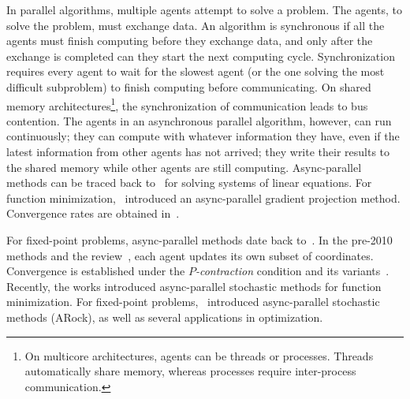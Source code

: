 In  parallel algorithms, multiple agents attempt to solve a problem. The agents, to solve the problem, must exchange data. An algorithm is synchronous if all the agents must finish computing before they exchange data, and only after the exchange is completed can they start the next computing cycle.  Synchronization requires every agent to wait for the slowest agent
(or the one solving the most difficult subproblem) to finish computing before communicating. On shared memory architectures\footnote{On multicore architectures, agents can be threads or processes. Threads automatically share memory, whereas processes require inter-process communication.}, the synchronization of communication leads to bus contention. The agents in an asynchronous parallel algorithm, however, can run continuously; they can compute with whatever information they have, even if the latest information from other agents
has not arrived; they write their results to the shared memory while other agents are still computing. Async-parallel methods can be traced back to~\citep{chazan1969chaotic} for solving systems of linear equations.
For function minimization,~\citep{bertsekas1989parallel} introduced an async-parallel gradient projection method. Convergence rates are obtained in~\citep{tseng1991rate-asyn}.

For fixed-point problems, async-parallel methods date back to~\citep{baudet1978asynchronous}. In  the pre-2010 methods \citep{BMR1997asyn-multisplit,bertsekas1983distributed,Baz200591,el1998flexible} and the review~\citep{frommer2000asynchronous}, each agent updates its own subset of coordinates. Convergence is established under the \emph{$P$-contraction} condition and its variants~\citep{bertsekas1983distributed}. Recently, the works \citep{nedic2001distributed,recht2011hogwild,liu2013asynchronous,liu2014asynchronous,hsieh2015passcode} introduced async-parallel stochastic methods for function minimization.
For fixed-point problems,~\citep{PengXuYanYin2015_arock} introduced async-parallel stochastic methods (ARock), as well as several applications in optimization.



